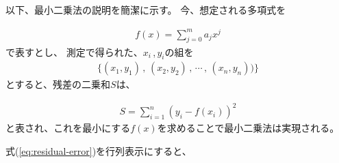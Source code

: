 \documentclass[titlepage]{jsreport}
\begin{document}
{{{以下、最小二乗法の説明を簡潔に示す。
今、想定される多項式を

\large
\begin{eqnarray}
f(x)=\sum_{j=0}^m a_jx^j \nonumber
\end{eqnarray}
\normalsize
で表すとし、
測定で得られた、$x_i$\,,\,$y_i$の組を
\large
\begin{eqnarray}
\{(x_1,y_1)\,,\,(x_2,y_2)\,,\,\cdots\,,\,(x_n,y_n)) \}\nonumber
\end{eqnarray}
\normalsize
とすると、残差の二乗和$S$は、

\large
\begin{eqnarray}
S=\sum_{i=1}^n (y_i-f(x_i))^2\label{eq:residual-error}
\end{eqnarray}
\normalsize
と表され、これを最小にする$f(x)$を求めることで最小二乗法は実現される。


式(\ref{eq:residual-error})を行列表示にすると、

}}}
\end{document}
